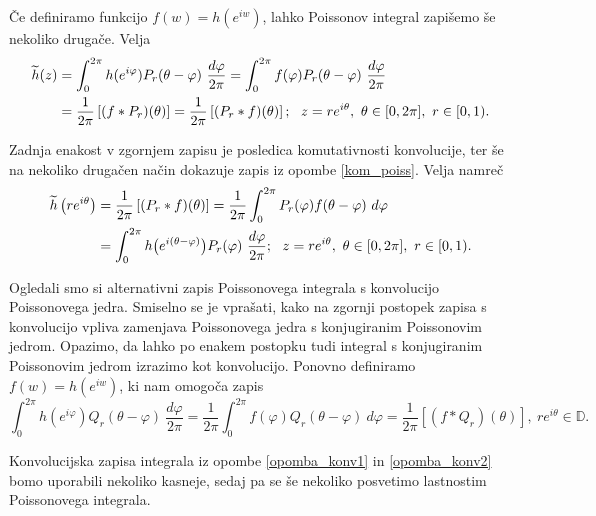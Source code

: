\documentclass[mat1, tisk]{fmfdelo}
\begin{document}
     \begin{opomba}
        \label{opomba_konv1}
        Če definiramo funkcijo $f(w) = h(e^{iw})$, lahko Poissonov integral zapišemo še nekoliko drugače. Velja
        \begin{align}
            \label{konv_Pr}
            \widetilde{h}(z) &= \int_{0}^{2\pi}{h(e^{i\varphi}) P_r(\theta - \varphi)~\frac{d\varphi}{2 \pi}} = \int_{0}^{2\pi}{f(\varphi) P_r(\theta - \varphi)~\frac{d\varphi}{2 \pi}} \notag \\
            & = \frac{1}{2\pi} \left[(f * P_r)(\theta)\right] = \frac{1}{2\pi} \left[(P_r * f)(\theta)\right];~~z = r e^{i\theta},~\theta \in [0,2\pi],~r\in[0,1).
        \end{align}

        Zadnja enakost v zgornjem zapisu je posledica komutativnosti konvolucije, ter še na nekoliko drugačen način dokazuje zapis iz opombe \ref{kom_poiss}. Velja namreč
        \begin{align*}
            \widetilde{h}\left(r e^{i \theta}\right) &= \frac{1}{2\pi} \left[(P_r * f)(\theta)\right] =  \frac{1}{2 \pi}\int_{0}^{2\pi}{P_r(\varphi) f(\theta - \varphi) ~d\varphi} \\
            & = \int_{0}^{2\pi}{h\big(e^{i(\theta-\varphi)}\big) P_r(\varphi)~\frac{d\varphi}{2 \pi}};~~z = r e^{i\theta},~\theta \in [0,2\pi],~r\in[0,1). \notag
        \end{align*}
     \end{opomba}

     \begin{opomba}
        \label{opomba_konv2}
        Ogledali smo si alternativni zapis Poissonovega integrala s konvolucijo Poissonovega jedra. Smiselno se je vprašati, kako na zgornji postopek zapisa s konvolucijo vpliva zamenjava Poissonovega jedra s konjugiranim Poissonovim jedrom. Opazimo, da lahko po enakem postopku tudi integral s konjugiranim Poissonovim jedrom izrazimo kot konvolucijo. 
        Ponovno definiramo $f(w) = h(e^{i w})$, ki nam omogoča zapis
        \begin{equation*}
            \int_{0}^{2\pi}{h(e^{i\varphi}) Q_r(\theta - \varphi)~\frac{d\varphi}{2 \pi}}  = \frac{1}{2\pi}\int_{0}^{2 \pi}{f(\varphi) Q_r(\theta - \varphi)~d\varphi} = \frac{1}{2 \pi}[(f * Q_r)(\theta)],~re^{i\theta} \in \mathbb{D}.
        \end{equation*}
     \end{opomba}
     Konvolucijska zapisa integrala iz opombe \ref{opomba_konv1} in \ref{opomba_konv2} bomo uporabili nekoliko kasneje, sedaj pa se še nekoliko posvetimo lastnostim Poissonovega integrala.
\end{document}
